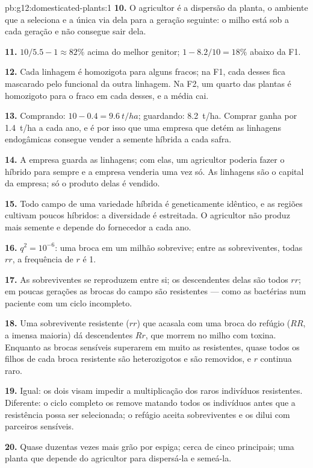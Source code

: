 \begin{solution}{pb:g12:domesticated-plants:1}
\textbf{10.} O agricultor é a dispersão da planta, o ambiente que a
seleciona e a única via dela para a geração seguinte: o milho está sob
 a cada geração e não consegue sair dela.

\textbf{11.} $10/5.5 - 1 \approx 82\%$ acima do melhor genitor;
$1 - 8.2/10 = 18\%$ abaixo da F1.

\textbf{12.} Cada linhagem é homozigota para alguns  
fracos; na F1, cada  desses fica mascarado pelo  funcional da
outra linhagem. Na F2, um quarto das plantas é homozigoto para o 
fraco em cada  desses, e a média cai.

\textbf{13.} Comprando: $10 - 0.4 = \qty{9.6}{t/ha}$; guardando: \qty{8.2}{t/ha}.
Comprar ganha por \qty{1.4}{t/ha} a cada ano, e é por isso que uma
empresa que detém as linhagens endogâmicas consegue vender a semente
híbrida a cada safra.

\textbf{14.} A empresa guarda as linhagens; com elas, um agricultor
poderia fazer o híbrido para sempre e a empresa venderia uma vez só. As
linhagens são o capital da empresa; só o produto delas é vendido.

\textbf{15.} Todo campo de uma variedade híbrida é geneticamente
idêntico, e as regiões cultivam poucos híbridos: a diversidade é
estreitada. O agricultor não produz mais semente e depende do
fornecedor a cada ano.

\textbf{16.} $q^2 = 10^{-6}$: uma broca em um milhão sobrevive; entre
as sobreviventes, todas $rr$, a frequência de $r$ é 1.

\textbf{17.} As sobreviventes se reproduzem entre si; os descendentes
delas são todos $rr$; em poucas gerações as brocas do campo são
resistentes --- como as bactérias num paciente com um ciclo incompleto.

\textbf{18.} Uma sobrevivente resistente ($rr$) que acasala com uma
broca do refúgio ($RR$, a imensa maioria) dá descendentes $Rr$, que
morrem no milho com toxina. Enquanto as brocas sensíveis superarem em
muito as resistentes, quase todos os filhos de cada broca resistente
são heterozigotos e são removidos, e $r$ continua raro.

\textbf{19.} Igual: os dois visam impedir a multiplicação dos raros
indivíduos resistentes. Diferente: o ciclo completo os remove matando
todos os indivíduos antes que a resistência possa ser selecionada; o
refúgio aceita sobreviventes e os dilui com parceiros sensíveis.

\textbf{20.} Quase duzentas vezes mais grão por espiga; cerca de cinco
 principais; uma planta que depende do agricultor para dispersá-la
e semeá-la.
\end{solution}
